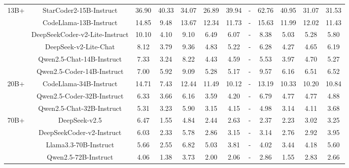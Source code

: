 \documentclass[11pt, a4paper, logo, copyright, nonumbering, amsart]{map}
\begin{document}
\begin{CJK*}{UTF8}{gbsn}
\begin{table*}[h!]
\begin{adjustbox}{width=\textwidth}
\begin{tabular}{c|c|cccccccccc}
    \midrule
    \multirow{6}{*}{13B+} 
    & StarCoder2-15B-Instruct & 36.90 & 40.33 & 34.07 & 26.89 & 39.94 & - & 62.76 & 40.95 & 31.07 & 31.53 \\
    & CodeLlama-13B-Instruct & 14.85 & 9.48 & 13.67 & 12.34 & 11.73 & - & 15.63 & 11.99 & 12.02 & 11.43 \\
    & DeepSeekCoder-v2-Lite-Instruct & 10.10 & 4.10 & 9.10 & 6.49 & 6.07 & - & 8.38 & 5.03 & 5.28 & 5.80 \\
    & DeepSeek-v2-Lite-Chat & 8.12 & 3.79 & 9.36 & 4.83 & 5.22 & - & 6.28 & 4.27 & 4.65 & 6.19 \\
    & Qwen2.5-Chat-14B-Instruct & 7.33 & 3.24 & 8.22 & 4.43 & 4.59 & - & 5.53 & 3.97 & 4.70 & 5.27 \\
    & Qwen2.5-Coder-14B-Instruct & 7.00 & 5.92 & 9.09 & 5.28 & 5.17 & - & 9.57 & 6.16 & 6.51 & 6.52 \\
    
    \midrule
    \multirow{3}{*}{20B+} 
    & CodeLlama-34B-Instruct & 14.71 & 7.43 & 12.44 & 11.49 & 10.12 & - & 13.19 & 10.33 & 10.20 & 10.84 \\
    & Qwen2.5-Coder-32B-Instruct & 6.33 & 3.66 & 6.16 & 3.59 & 4.20 & - & 6.79 & 4.77 & 4.77 & 4.88 \\
    & Qwen2.5-Chat-32B-Instruct & 5.31 & 3.23 & 5.90 & 3.15 & 4.15 & - & 4.98 & 3.14 & 4.11 & 3.68 \\
    
    \midrule
    \multirow{4}{*}{70B+} 
    & DeepSeek-v2.5 & 6.47 & 1.55 & 4.84 & 2.44 & 2.63 & - & 2.37 & 2.23 & 3.02 & 3.25 \\
    & DeepSeekCoder-v2-Instruct & 6.03 & 2.33 & 5.78 & 2.86 & 3.15 & - & 3.14 & 2.76 & 2.92 & 3.95 \\
    & Llama3.3-70B-Instruct & 5.66 & 2.55 & 6.82 & 5.03 & 3.81 & - & 4.02 & 3.44 & 4.18 & 5.60 \\
    & Qwen2.5-72B-Instruct & 4.06 & 1.38 & 3.73 & 2.00 & 2.06 & - & 2.86 & 1.55 & 2.83 & 2.66 \\
    

\end{tabular}
\end{adjustbox}
\end{table*}
\end{CJK*}
\end{document}
